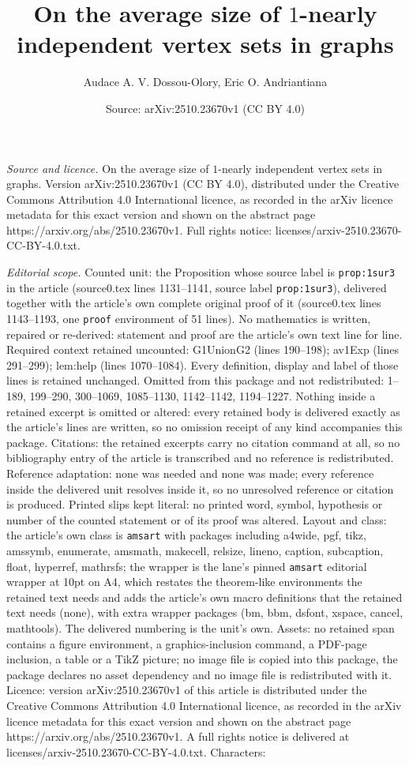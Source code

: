 \documentclass[10pt,a4paper]{amsart}
\title[On the average size of $1$-nearly independent vertex sets in]{On the average size of $1$-nearly independent vertex sets in graphs}
\author{Audace A. V. Dossou-Olory, Eric O. Andriantiana}
\date{Source: arXiv:2510.23670v1 (CC BY 4.0)}
\begin{document}
\maketitle

\noindent\emph{Source and licence.} On the average size of $1$-nearly independent vertex sets in graphs. Version arXiv:2510.23670v1 (CC BY 4.0), distributed under the Creative Commons Attribution 4.0 International licence, as recorded in the arXiv licence metadata for this exact version and shown on the abstract page https://arxiv.org/abs/2510.23670v1. Full rights notice: licenses/arxiv-2510.23670-CC-BY-4.0.txt.\par\smallskip

\noindent\textit{Editorial scope.} Counted unit: the Proposition whose source label is \texttt{prop:1sur3} in the article (source0.tex lines 1131--1141, source label \texttt{prop:1sur3}), delivered together with the article's own complete original proof of it (source0.tex lines 1143--1193, one \texttt{proof} environment of 51 lines). No mathematics is written, repaired or re-derived: statement and proof are the article's own text line for line. Required context retained uncounted: G1UnionG2 (lines 190--198); av1Exp (lines 291--299); lem:help (lines 1070--1084). Every definition, display and label of those lines is retained unchanged. Omitted from this package and not redistributed: 1--189, 199--290, 300--1069, 1085--1130, 1142--1142, 1194--1227. Nothing inside a retained excerpt is omitted or altered: every retained body is delivered exactly as the article's lines are written, so no omission receipt of any kind accompanies this package. Citations: the retained excerpts carry no citation command at all, so no bibliography entry of the article is transcribed and no reference is redistributed. Reference adaptation: none was needed and none was made; every reference inside the delivered unit resolves inside it, so no unresolved reference or citation is produced. Printed slips kept literal: no printed word, symbol, hypothesis or number of the counted statement or of its proof was altered. Layout and class: the article's own class is \texttt{amsart} with packages including a4wide, pgf, tikz, amssymb, enumerate, amsmath, makecell, relsize, lineno, caption, subcaption, float, hyperref, mathrsfs; the wrapper is the lane's pinned \texttt{amsart} editorial wrapper at 10pt on A4, which restates the theorem-like environments the retained text needs and adds the article's own macro definitions that the retained text needs (none), with extra wrapper packages (bm, bbm, dsfont, xspace, cancel, mathtools). The delivered numbering is the unit's own. Assets: no retained span contains a figure environment, a graphics-inclusion command, a PDF-page inclusion, a table or a TikZ picture; no image file is copied into this package, the package declares no asset dependency and no image file is redistributed with it. Licence: version arXiv:2510.23670v1 of this article is distributed under the Creative Commons Attribution 4.0 International licence, as recorded in the arXiv licence metadata for this exact version and shown on the abstract page https://arxiv.org/abs/2510.23670v1. A full rights notice is delivered at licenses/arxiv-2510.23670-CC-BY-4.0.txt. Characters: 
\end{document}
